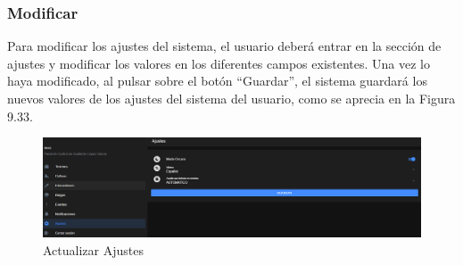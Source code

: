 \subsubsection{Modificar}
Para modificar los ajustes del sistema, el usuario deberá entrar en la sección de ajustes y modificar los valores en los diferentes campos existentes. Una vez lo haya modificado, al pulsar sobre el botón ``Guardar'', el sistema guardará los nuevos valores de los ajustes del sistema del usuario, como se aprecia en la Figura 9.33.
\begin{figure}[H]
    \centering
    \includegraphics[width=0.7\linewidth]{images/user-manual/settings/update.png}
    \caption{Actualizar Ajustes}
\end{figure}